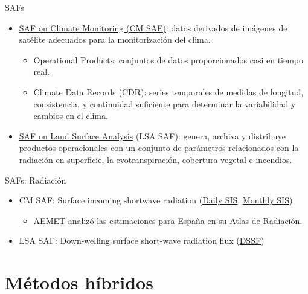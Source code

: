 \documentclass[aspectratio=169, usenames,svgnames,dvipsnames]{beamer}
\begin{document}
\begin{frame}[label={sec:orgf365919}]{SAFs}
\begin{itemize}
\item \href{https://wui.cmsaf.eu/safira/action/viewProduktSearch}{SAF on Climate Monitoring (CM SAF)}: datos derivados de imágenes de satélite adecuados para la monitorización del clima.

\begin{itemize}
\item Operational Products: conjuntos de datos proporcionados casi en tiempo real.

\item Climate Data Records (CDR): series temporales de medidas de longitud, consistencia, y continuidad suficiente para determinar la variabilidad y cambios en el clima.
\end{itemize}

\item \href{https://landsaf.ipma.pt/en/}{SAF on Land Surface Analysis} (LSA SAF): genera, archiva y distribuye productos operacionales con un conjunto de parámetros relacionados con la radiación en superficie, la evotranspiración, cobertura vegetal e incendios.
\end{itemize}
\end{frame}

\begin{frame}[label={sec:orgf22c515}]{SAFs: Radiación}
\begin{itemize}
\item \alert{CM SAF}: Surface incoming shortwave radiation (\href{https://wui.cmsaf.eu/safira/action/viewProduktDetails?eid=22482\&fid=36}{Daily SIS}, \href{https://wui.cmsaf.eu/safira/action/viewProduktDetails?eid=22483\&fid=36}{Monthly SIS})

\begin{itemize}
\item AEMET analizó las estimaciones para España en su \href{http://www.aemet.es/es/serviciosclimaticos/datosclimatologicos/atlas\_radiacion\_solar}{Atlas de Radiación}.
\end{itemize}

\item \alert{LSA SAF}: Down-welling surface short-wave radiation flux (\href{https://landsaf.ipma.pt/en/products/longwave-shortwave-radiation/dssf/}{DSSF})
\end{itemize}
\end{frame}

\section{Métodos híbridos}
\label{sec:org87662f2}
\end{document}
